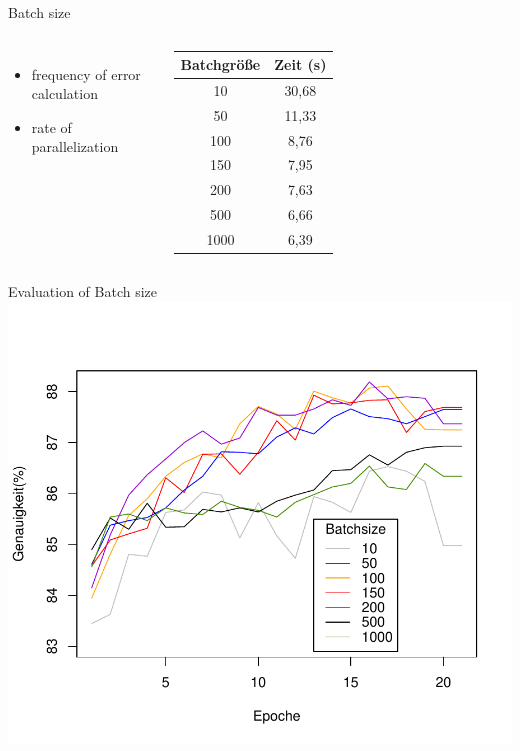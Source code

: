 \documentclass[aspectratio=1610, 12pt]{beamer}
\begin{document}
\begin{frame}{Batch size}
\begin{columns}
	\begin{itemize}
		\item frequency of error calculation
		\item rate of parallelization
	\end{itemize}
	\centering
	\begin{tabular}{|c|c|}\hline
		Batchgröße&Zeit (s)\\\hline
		10&30,68\\\hline
		50&11,33\\\hline
		100&8,76\\\hline
		150&7,95\\\hline
		200&7,63\\\hline
		500&6,66\\\hline
		1000&6,39\\\hline
		
	\end{tabular}
\end{columns}
\end{frame}

\begin{frame}{Evaluation of Batch size}
\centering
\vspace*{-1cm}\includegraphics[scale=0.62]{images/batchsize_measurement.pdf}
\end{frame}
\end{document}
